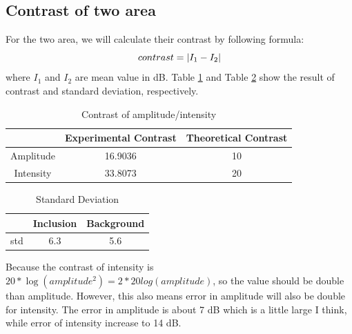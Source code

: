 \documentclass{article}
\DeclarePairedDelimiter\abs{\lvert}{\rvert}%
\begin{document}
\subsection{Contrast of two area}
For the two area, we will calculate their contrast by following formula:
$$
	contrast = \abs{I_1 - I_2}
$$
where $I_1$ and $I_2$ are mean value in dB. Table \ref{tab:contrast} and Table \ref{tab:std} show the result of contrast and standard 
deviation, respectively.
\begin{table}[H]
  \centering
  
    \begin{tabular}{|c|c|c|}
    \hline
          & Experimental Contrast & Theoretical Contrast \bigstrut\\
    \hline
    Amplitude & 16.9036 & 10 \bigstrut\\
    \hline
    Intensity & 33.8073 & 20 \bigstrut\\
    \hline
    \end{tabular}%
    \caption{Contrast of amplitude/intensity}
  \label{tab:contrast}%
\end{table}%
\begin{table}[H]
  \centering
    \begin{tabular}{|c|c|c|}
    \hline
          & \multicolumn{1}{l|}{ Inclusion } & \multicolumn{1}{l|}{Background} \bigstrut\\
    \hline
    std   & 6.3   & 5.6 \bigstrut\\
    \hline
    \end{tabular}%
    \caption{Standard Deviation}
  \label{tab:std}%
\end{table}%

Because the contrast of intensity is $20 * \log(amplitude^2) = 2 * 20 log(amplitude)$, so the value should be double than amplitude. However, this
also means error in amplitude will also be double for intensity. The error in amplitude is about 7 dB which is a little large I think, 
while error of intensity increase to 14 dB.
\end{document}
